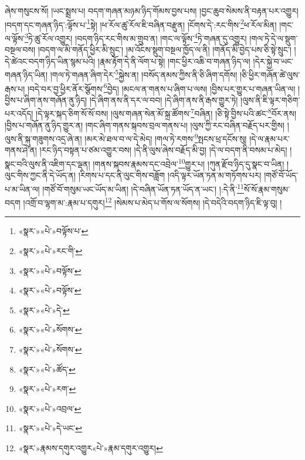 ཞེས་གསུངས་སོ། །ཡང་སྨྲས་པ། བདག་གཞན་མཉམ་ཉིད་གོམས་བྱས་པས། །བྱང་ཆུབ་སེམས་ནི་བརྟན་པར་འགྱུར། །བདག་དང་གཞན་ཉིད་:ལྟོས་པ་\footnote{«སྣར་»«པེ་»བལྟོས་པ་}སྟེ། །ཕ་རོལ་ཚུ་རོལ་ཇི་བཞིན་བརྫུན། །ངོགས་དེ་:རང་གིས་\footnote{«སྣར་»«པེ་»རང་གི་}ཕ་རོལ་མིན། །གང་ལ་ལྟོས་\footnote{«སྣར་»«པེ་»བལྟོས་}ཏེ་ཚུ་རོལ་འགྱུར། །བདག་ཉིད་རང་གིས་མ་གྲུབ་ན། །གང་ལ་ལྟོས་\footnote{«སྣར་»«པེ་»བལྟོས་}ཏེ་གཞན་དུ་འགྱུར། །གལ་ཏེ་དེ་ལ་སྡུག་བསྔལ་བས། །བདག་ལ་མི་གནོད་ཕྱིར་མི་སྲུང་། །མ་འོངས་སྡུག་བསྔལ་ཁྱོད་ལ་ནི། །གནོད་མི་བྱེད་པས་ཅི་སྟེ་སྲུང་། །དེ་ཚེའང་བདག་ཉིད་ཡིན་སྙམ་པའི། །རྣམ་རྟོག་དེ་ནི་ལོག་པ་སྟེ། །གང་ཕྱིར་འཆི་བ་གཞན་ཉིད་ལ། །དེར་སྐྱེ་བ་ཡང་གཞན་ཉིད་ཡིན། །གལ་ཏེ་གཞན་ཞིག་དེར་\footnote{«སྣར་»«པེ་»དེ་}སྐྱེས་ན། །བསོད་ནམས་ཀྱིས་ནི་ཅི་ཞིག་དགོས། །ཅི་ཕྱིར་གཞོན་ཚེ་ལུས་རྒས་པ། །བདེ་བར་བྱ་ཕྱིར་ནོར་སྩོགས་\footnote{«སྣར་»«པེ་»སོགས་}བྱེད། །མངལ་ན་གནས་པ་ཞིག་པ་ལས། །བྱིས་པར་གྱུར་པ་གཞན་ཡིན་ལ། །བྱིས་པ་ཞིག་ནས་གཞོན་ནུ་ཉིད། །དེ་ཞིག་ནས་ནི་དར་ལ་བབ། །དེ་ཞིག་ནས་ནི་རྒས་གྱུར་ཏེ། །ལུས་ནི་ཇི་ལྟར་གཅིག་པར་འདོད། །དེ་ལྟར་སྐད་ཅིག་སོ་སོ་བས། །ལུས་གཞན་སེན་མོ་སྐྲ་ཚོགས་\footnote{«སྣར་»«པེ་»སོགས་}བཞིན། །ཅི་སྟེ་བྱིས་པའི་ཚང་\footnote{«སྣར་»«པེ་»ཚོད་}བོར་ནས། །བྱིས་པ་གཞོན་ནུ་ཉིད་གྱུར་ན། །གང་ཞིག་གནས་སྐབས་བྲལ་གནས་པ། །ལུས་ཀྱི་རང་བཞིན་བརྗོད་པར་གྱིས། །ལུས་ནི་སྐུ་གཟུགས་འདྲ་ཞེ་ན། །མར་མེ་ཐལ་བ་ལ་དེ་མེད། །གལ་ཏེ་རགས་\footnote{«སྣར་»«པེ་»རག་}སྤངས་ཕྲ་དངོས་སུ། །དེ་ལ་རྣམ་པར་གནས་ཤེ་ན། །རང་ཉིད་བསྟན་པ་ཙམ་འགྱུར་བས། །དེ་ནི་ལུས་ཞེས་བརྗོད་མི་བྱ། །དེ་ལ་བདག་ནི་བསམ་པ་མེད། །སྣང་བའི་ལུས་ནི་འཇིག་དང་ལྡན། །གནས་སྐབས་རྣམས་དང་འབྲེལ་\footnote{«སྣར་»«པེ་»འབྲལ་}གྱུར་པ། །ཀུན་རྫོབ་ཉིད་དུ་སྣང་བ་ཡིན། །ལུང་གིས་ཀྱང་ནི་དེ་ཡོད་ན། །རིགས་པ་དང་ནི་ལུང་གིས་བཟློག །འདི་ལྟར་ཡོན་ཏན་མ་གཏོགས་པར། །གཙོ་བོ་ཡོད་པ་མ་ཡིན་ལ། །གཙོ་བོ་གསུམ་ཡང་ཡོད་མ་ཡིན། །དེ་བཞིན་ཡོན་ཏན་ཡོད་ན་ཡང་། །:དེ་ནི་\footnote{«སྣར་»«པེ་»དེ་ཡང་}སོ་སོ་རྣམ་གསུམ་བདག །འགྲོ་བ་ལྷག་མ་:རྣམ་པ་དགུར།\footnote{«སྣར་»རྣམས་དགུར་འགྱུར«པེ་»རྣམ་དགུར་འགྱུར།} །སེམས་པ་མེད་པ་གོས་ལ་སོགས། །དེ་བདེའི་བདག་ཉིད་ཇི་ལྟ་བུ། །
